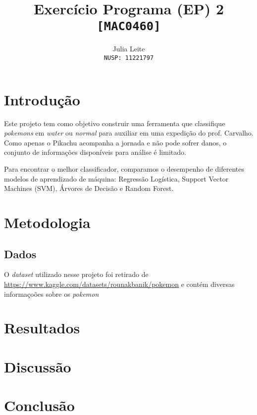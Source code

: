 \documentclass{article}
\title{Exercício Programa (EP) 2\\
    \large \texttt{[MAC0460]}}
\author{Julia Leite\\
    \large \texttt{NUSP: 11221797}}
\begin{document}
    
\maketitle

\tableofcontents

\section{Introdução}

Este projeto tem como objetivo construir uma ferramenta que classifique \textit{pokemons} em \textit{water} ou \textit{normal} para auxiliar em uma expedição do prof. Carvalho. Como apenas o Pikachu acompanha a jornada e não pode sofrer danos, o conjunto de informações disponíveis para análise é limitado.

Para encontrar o melhor classificador, comparamos o desempenho de diferentes modelos de aprendizado de máquina: Regressão Logística, Support Vector Machines (SVM), Árvores de Decisão e Random Forest.

\section{Metodologia}

\subsection{Dados}

O \textit{dataset} utilizado nesse projeto foi retirado de \url{https://www.kaggle.com/datasets/rounakbanik/pokemon} e contém diversas informaçoões sobre os \textit{pokemon} 

\section{Resultados}

\section{Discussão}

\section{Conclusão}
\end{document}
